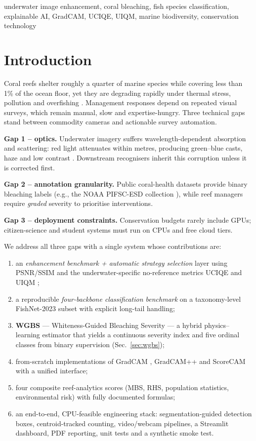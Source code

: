 \documentclass[conference]{IEEEtran}
\begin{document}
\begin{IEEEkeywords}
underwater image enhancement, coral bleaching, fish species classification, explainable AI, GradCAM, UCIQE, UIQM, marine biodiversity, conservation technology
\end{IEEEkeywords}

\section{Introduction}
Coral reefs shelter roughly a quarter of marine species while covering less than 1\% of the ocean floor, yet they are degrading rapidly under thermal stress, pollution and overfishing \cite{hughes2017coral}. Management responses depend on repeated visual surveys, which remain manual, slow and expertise-hungry. Three technical gaps stand between commodity cameras and actionable survey automation.

\textbf{Gap 1 -- optics.} Underwater imagery suffers wavelength-dependent absorption and scattering: red light attenuates within metres, producing green--blue casts, haze and low contrast \cite{akkaynak2017color}. Downstream recognisers inherit this corruption unless it is corrected first.

\textbf{Gap 2 -- annotation granularity.} Public coral-health datasets provide binary bleaching labels (e.g., the NOAA PIFSC-ESD collection \cite{noaa2024coral}), while reef managers require \emph{graded} severity to prioritise interventions.

\textbf{Gap 3 -- deployment constraints.} Conservation budgets rarely include GPUs; citizen-science and student systems must run on CPUs and free cloud tiers.

We address all three gaps with a single system whose contributions are:
\begin{enumerate}
  \item an \emph{enhancement benchmark + automatic strategy selection} layer using PSNR/SSIM and the underwater-specific no-reference metrics UCIQE \cite{yang2015uciqe} and UIQM \cite{panetta2016uiqm};
  \item a reproducible \emph{four-backbone classification benchmark} on a taxonomy-level FishNet-2023 \cite{khan2023fishnet} subset with explicit long-tail handling;
  \item \textbf{WGBS} --- Whiteness-Guided Bleaching Severity --- a hybrid physics--learning estimator that yields a continuous severity index and five ordinal classes from binary supervision (Sec.~\ref{sec:wgbs});
  \item from-scratch implementations of GradCAM \cite{selvaraju2017gradcam}, GradCAM++ \cite{chattopadhyay2018gradcampp} and ScoreCAM \cite{wang2020scorecam} with a unified interface;
  \item four composite reef-analytics scores (MBS, RHS, population statistics, environmental risk) with fully documented formulas;
  \item an end-to-end, CPU-feasible engineering stack: segmentation-guided detection boxes, centroid-tracked counting, video/webcam pipelines, a Streamlit dashboard, PDF reporting, unit tests and a synthetic smoke test.
\end{enumerate}
\end{document}
